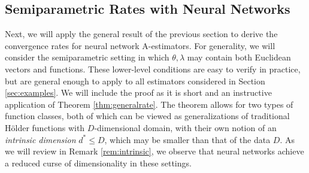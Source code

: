 \documentclass[12pt]{article}
\theoremstyle{myplain}
\theoremstyle{definition}
\theoremstyle{definition}
\theoremstyle{remark}
\numberwithin{equation}{section}
\begin{document}
\subsection{Semiparametric Rates with Neural Networks}
\label{subsec:neuralArate}
Next, we will apply the general result of the previous section to derive the convergence rates for neural network A-estimators. For generality, we will consider the semiparametric setting in which $\theta,\lambda$ may contain both Euclidean vectors and functions. These lower-level conditions are easy to verify in practice, but are general enough to apply to all estimators considered in Section \ref{sec:examples}. We will include the proof as it is short and an instructive application of Theorem \ref{thm:generalrate}. The theorem allows for two types of function classes, both of which can be viewed as generalizations of traditional Hölder functions with $D$-dimensional domain, with their own notion of an {\it intrinsic dimension} $d^*\leq D$, which may be smaller than that of the data $D$. As we will review in Remark \ref{rem:intrinsic}, we observe that neural networks achieve a reduced curse of dimensionality in these settings.
\end{document}

